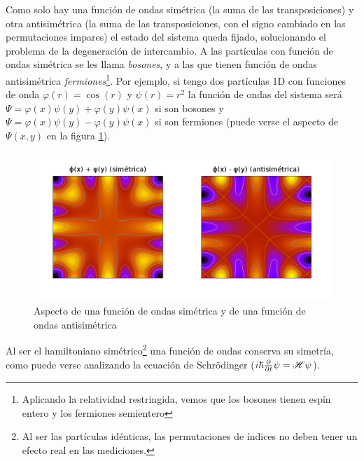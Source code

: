 Como solo hay una función de ondas simétrica (la suma de las
transposiciones) y otra antisimétrica (la suma de las transposiciones,
con el signo cambiado en las permutaciones impares) el estado del
sistema queda fijado, solucionando el problema de la degeneración de
intercambio. A las partículas con función de ondas simétrica
se les llama \emph{bosones}, y a las que tienen función de ondas
antisimétrica \emph{fermiones}\footnote{Aplicando la relatividad
  restringida, vemos que los bosones tienen espín entero y los
  fermiones semientero}. Por ejemplo, si tengo dos partículas 1D con
funciones de onda $\varphi(r) = \cos(r)$ y $\psi(r)=r^2$ la función de
ondas del sistema será $\Psi=\varphi(x)\psi(y)+\varphi(y)\psi(x)$ si son bosones
y $\Psi=\varphi(x)\psi(y)-\varphi(y)\psi(x)$ si son fermiones (puede verse el
aspecto de $\Psi(x,y)$ en la figura \ref{fig:simetry}).

\begin{figure}
  \centering
  \includegraphics[width=\textwidth]{figures/simetry.png}
  \caption{Aspecto de una función de ondas simétrica y de una función de
    ondas antisimétrica}
  \label{fig:simetry}
  \forceversofloat
\end{figure}

Al ser el hamiltoniano simétrico\footnote{Al ser las partículas
  idénticas, las permutaciones de índices no deben tener un efecto
  real en las mediciones.} una función de ondas conserva su
simetría, como puede verse analizando la ecuación de Schrödinger ($i
\hbar \pdv{t} \psi =  \mathscr{H} \psi$).

